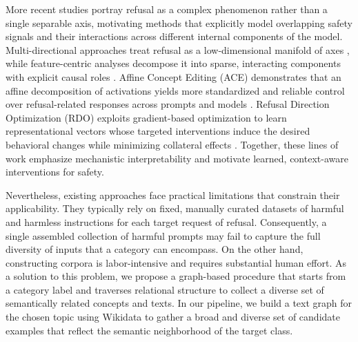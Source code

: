 \documentclass{article}
\theoremstyle{plain}
\theoremstyle{definition}
\theoremstyle{remark}
\begin{document}


More recent studies portray refusal as a complex phenomenon rather than a single separable axis, motivating methods that explicitly model overlapping safety signals and their interactions across different internal components of the model. Multi-directional approaches treat refusal as a low-dimensional manifold of axes \cite{piras2025som}, while feature-centric analyses decompose it into sparse, interacting components with explicit causal roles \cite{prakash2025beyond}. Affine Concept Editing (ACE) demonstrates that an affine decomposition of activations yields more standardized and reliable control over refusal-related responses across prompts and models \cite{marshall2024refusal}. Refusal Direction Optimization (RDO) exploits gradient-based optimization to learn representational vectors whose targeted interventions induce the desired behavioral changes while minimizing collateral effects \cite{wollschlager2025geometry}. Together, these lines of work emphasize mechanistic interpretability and motivate learned, context-aware interventions for safety.


Nevertheless, existing approaches face practical limitations that constrain their applicability. They typically rely on fixed, manually curated datasets of harmful and harmless instructions for each target request of refusal. 
Consequently, a single assembled collection of harmful prompts may fail to capture the full diversity of inputs that a category can encompass. On the other hand, constructing corpora is labor-intensive and requires substantial human effort. As a solution to this problem, we propose a graph-based procedure that starts from a category label and traverses relational structure to collect a diverse set of semantically related concepts and texts. In our pipeline, we build a text graph for the chosen topic using Wikidata \cite{10.1145/2629489} to gather a broad and diverse set of candidate examples that reflect the semantic neighborhood of the target class.
\end{document}
